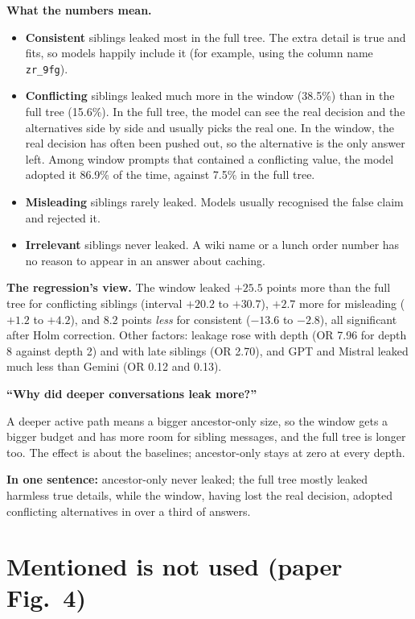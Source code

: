 \textbf{What the numbers mean.}
\begin{itemize}
\item \textbf{Consistent} siblings leaked most in the full tree. The extra detail is true and fits, so models happily include it (for example, using the column name \texttt{zr\_9fg}).
\item \textbf{Conflicting} siblings leaked much more in the window (38.5\%) than in the full tree (15.6\%). In the full tree, the model can see the real decision and the alternatives side by side and usually picks the real one. In the window, the real decision has often been pushed out, so the alternative is the only answer left. Among window prompts that contained a conflicting value, the model adopted it 86.9\% of the time, against 7.5\% in the full tree.
\item \textbf{Misleading} siblings rarely leaked. Models usually recognised the false claim and rejected it.
\item \textbf{Irrelevant} siblings never leaked. A wiki name or a lunch order number has no reason to appear in an answer about caching.
\end{itemize}

\textbf{The regression's view.} The window leaked $+25.5$ points more than the full tree for conflicting siblings (interval $+20.2$ to $+30.7$), $+2.7$ more for misleading ($+1.2$ to $+4.2$), and $8.2$ points \emph{less} for consistent ($-13.6$ to $-2.8$), all significant after Holm correction. Other factors: leakage rose with depth (OR 7.96 for depth 8 against depth 2) and with late siblings (OR 2.70), and GPT and Mistral leaked much less than Gemini (OR 0.12 and 0.13).

\begin{ask}
\textbf{``Why did deeper conversations leak more?''}\par
A deeper active path means a bigger ancestor-only size, so the window gets a bigger budget and has more room for sibling messages, and the full tree is longer too. The effect is about the baselines; ancestor-only stays at zero at every depth.
\end{ask}

\textbf{In one sentence:} ancestor-only never leaked; the full tree mostly leaked harmless true details, while the window, having lost the real decision, adopted conflicting alternatives in over a third of answers.

\section{Mentioned is not used (paper Fig.~4)}

